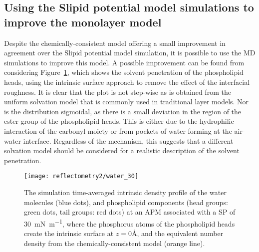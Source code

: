 \subsection{Using the Slipid potential model simulations to improve the monolayer model}
Despite the chemically-consistent model offering a small improvement in agreement over the Slipid potential model simulation, it is possible to use the MD simulations to improve this model.
A possible improvement can be found from considering Figure~\ref{fig:waters30}, which shows the solvent penetration of the phospholipid heads, using the intrinsic surface approach to remove the effect of the interfacial roughness.
It is clear that the plot is not step-wise as is obtained from the uniform solvation model that is commonly used in traditional layer models.
Nor is the distribution sigmoidal, as there is a small deviation in the region of the ester group of the phospholipid heads.
This is either due to the hydrophilic interaction of the carbonyl moiety or from pockets of water forming at the air-water interface.
Regardless of the mechanism, this suggests that a different solvation model should be considered for a realistic description of the solvent penetration.
%
\begin{figure}[t]
  \forceversofloat
    \centering
    \texttt{[image: reflectometry2/water\_30]}
    \caption{The simulation time-averaged intrinsic density profile of the water molecules (blue dots), and phospholipid components (head groups: green dots, tail groups: red dots) at an APM associated with a SP of \SI{30}{\milli\newton\per\meter}, where the phosphorus atoms of the phospholipid heads create the intrinsic surface at $z=0$\si{\angstrom}, and the equivalent number density from the chemically-consistent model (orange line).}
    \label{fig:waters30}
\end{figure}
%

